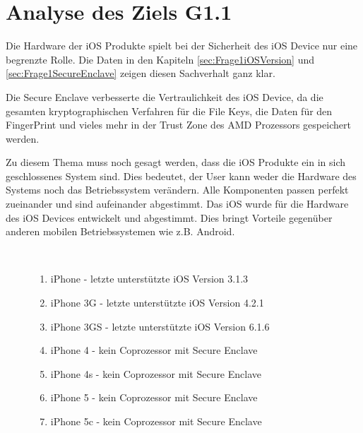 \section{Analyse des Ziels G1.1}
\label{sec:AnalyseG11}
 Die Hardware der iOS Produkte spielt bei der Sicherheit des iOS Device nur eine begrenzte Rolle. Die Daten in den Kapiteln \ref{sec:Frage1iOSVersion} und \ref{sec:Frage1SecureEnclave} zeigen diesen Sachverhalt ganz klar.\par  
Die Secure Enclave verbesserte die Vertraulichkeit des iOS Device, da die gesamten kryptographischen Verfahren für die File Keys, die Daten für den FingerPrint und vieles mehr in der Trust Zone des AMD Prozessors gespeichert werden. \par
Zu diesem Thema muss noch gesagt werden, dass die iOS Produkte ein in sich geschlossenes System sind. Dies bedeutet, der User kann weder die Hardware des Systems noch das Betriebssystem verändern. Alle Komponenten passen perfekt zueinander und sind aufeinander abgestimmt. Das iOS wurde für die Hardware des iOS Devices entwickelt und abgestimmt. Dies bringt Vorteile gegenüber anderen mobilen Betriebssystemen wie z.B. Android.  

\begin{description}
    \item[\parbox{\textwidth} {Zum heutigen Zeitpunkt sind sieben iOS Devices als nicht sicher einzustufen}]~\par
    \begin{enumerate}
        \item iPhone - letzte unterstützte iOS Version 3.1.3
        \item iPhone 3G - letzte unterstützte iOS Version 4.2.1
        \item iPhone 3GS - letzte unterstützte iOS Version 6.1.6
        \item iPhone 4 - kein Coprozessor mit Secure Enclave
        \item iPhone 4s - kein Coprozessor mit Secure Enclave
        \item iPhone 5 - kein Coprozessor mit Secure Enclave
        \item iPhone 5c - kein Coprozessor mit Secure Enclave
    \end{enumerate}
\end{description} 
 
